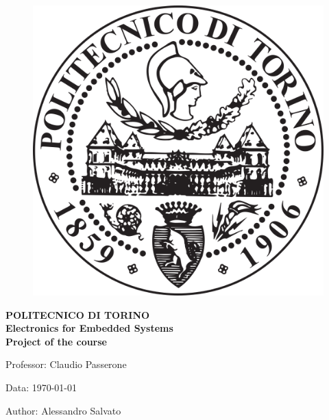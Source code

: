 \thispagestyle{empty}
\begin{figure}[H]
\centering
\includegraphics[scale=.3]{Immagini/262}
\label{262}
\end{figure}
\begin{center}
\LARGE { \textbf {POLITECNICO DI TORINO} }\\ [1\baselineskip]
\huge{ \textbf{Electronics for Embedded Systems}}\\ [1\baselineskip]
\Huge{\textbf{Project of the course}}\\[1\baselineskip]


\end{center}

\begin{flushleft}
\large{Professor: Claudio Passerone}
\end{flushleft}
\begin{flushleft}
\large{Data: \today}
\end{flushleft}
\begin{flushleft}
\large{Author: Alessandro Salvato} 
\end{flushleft}


\clearpage